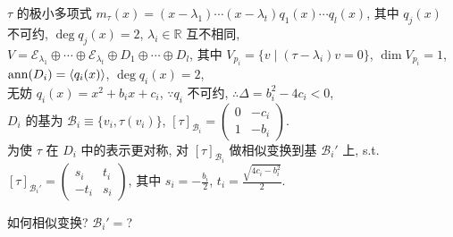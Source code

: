 \documentclass{note}
\begin{document}
\begin{pf}
    $\tau$ 的极小多项式 $m_{\tau}(x)=(x-\lambda_1)\cdots(x-\lambda_t)q_1(x)\cdots q_l(x)$, 其中 $q_j(x)$ 不可约, $\deg q_j(x)=2$, $\lambda_i\in\mathbb{R}$ 互不相同,\\
    $V=\mathcal{E}_{\lambda_1}\oplus\cdots\oplus\mathcal{E}_{\lambda_t}\oplus D_1\oplus\cdots\oplus D_l$, 其中 $V_{p_i}=\{v\mid(\tau-\lambda_i)v=0\}$, $\dim V_{p_i}=1$, $\operatorname{ann}(D_i)=\langle q_i(x)\rangle$, $\deg q_i(x)=2$,\\
    无妨 $q_i(x)=x^2+b_ix+c_i$, $\because q_i$ 不可约, $\therefore\Delta=b_i^2-4c_i<0$,\\
    $D_i$ 的基为 $\mathcal{B}_i\equiv\{v_i,\tau(v_i)\}$, $[\tau]_{\mathcal{B}_i}=\begin{pmatrix}
        0&-c_i\\
        1&-b_i
    \end{pmatrix}$.\\
    为使 $\tau$ 在 $D_i$ 中的表示更对称, 对 $[\tau]_{\mathcal{B}_i}$ 做相似变换到基 $\mathcal{B}_i'$ 上, s.t. $[\tau]_{\mathcal{B}_i'}=\begin{pmatrix}
        s_i&t_i\\
        -t_i&s_i
    \end{pmatrix}$, 其中 $s_i=-\frac{b_i}{2}$, $t_i=\frac{\sqrt{4c_i-b_i^2}}{2}$.
    \begin{prob}
        如何相似变换? $\mathcal{B}_i'=$?
    \end{prob}
\end{pf}
\end{document}
